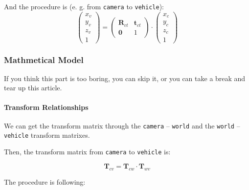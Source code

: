 \documentclass{article}
\begin{document}
And the procedure is (e. g. from \texttt{camera} to \texttt{vehicle}):
\begin{equation}
  \left(
    \begin{matrix}
      x_v \\
      y_v \\
      z_v \\
      1
    \end{matrix}
  \right)=\left(
    \begin{matrix}
      \boldsymbol{R}_{ct} & \boldsymbol{t}_{ct} \\
      \boldsymbol{0} & 1
    \end{matrix}
  \right)\cdot\left(
    \begin{matrix}
      x_c \\
      y_c \\
      z_c \\
      1
    \end{matrix}
  \right)
\end{equation}

\subsubsection{Mathmetical Model}

If you think this part is too boring, you can skip it, or you can take a break and tear up this article.

\paragraph{Transform Relationships}

We can get the transform matrix through the \texttt{camera} -- \texttt{world} and the \texttt{world} -- \texttt{vehicle} transform matrixes.

Then, the transform matrix from \texttt{camera} to \texttt{vehicle} is:

\begin{equation}
  \boldsymbol{T}_{cv}=\boldsymbol{T}_{cw}\cdot\boldsymbol{T}_{wv}
\end{equation}

The procedure is following:
\end{document}
